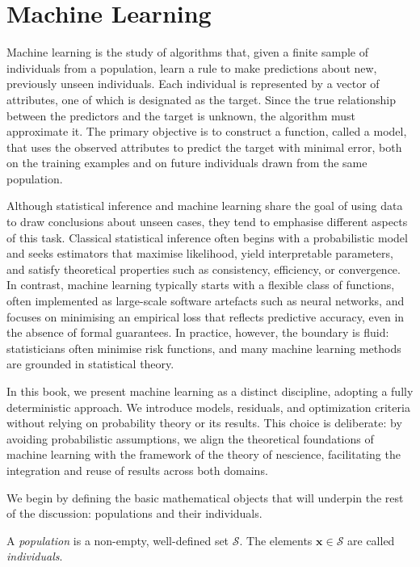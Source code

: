 \section{Machine Learning}
\label{sec:machine_learning}

Machine learning is the study of algorithms that, given a finite sample of individuals from a population, learn a rule to make predictions about new, previously unseen individuals. Each individual is represented by a vector of attributes, one of which is designated as the target. Since the true relationship between the predictors and the target is unknown, the algorithm must approximate it. The primary objective is to construct a function, called a model, that uses the observed attributes to predict the target with minimal error, both on the training examples and on future individuals drawn from the same population.

Although statistical inference and machine learning share the goal of using data to draw conclusions about unseen cases, they tend to emphasise different aspects of this task. Classical statistical inference often begins with a probabilistic model and seeks estimators that maximise likelihood, yield interpretable parameters, and satisfy theoretical properties such as consistency, efficiency, or convergence. In contrast, machine learning typically starts with a flexible class of functions, often implemented as large-scale software artefacts such as neural networks, and focuses on minimising an empirical loss that reflects predictive accuracy, even in the absence of formal guarantees. In practice, however, the boundary is fluid: statisticians often minimise risk functions, and many machine learning methods are grounded in statistical theory.

In this book, we present machine learning as a distinct discipline, adopting a fully deterministic approach. We introduce models, residuals, and optimization criteria without relying on probability theory or its results. This choice is deliberate: by avoiding probabilistic assumptions, we align the theoretical foundations of machine learning with the framework of the theory of nescience, facilitating the integration and reuse of results across both domains.

We begin by defining the basic mathematical objects that will underpin the rest of the discussion: populations and their individuals.

\begin{definition}
A \emph{population} is a non-empty, well-defined set $\mathcal{S}$. The elements $\mathbf{x}\in\mathcal{S}$ are called \emph{individuals}.
\end{definition}

